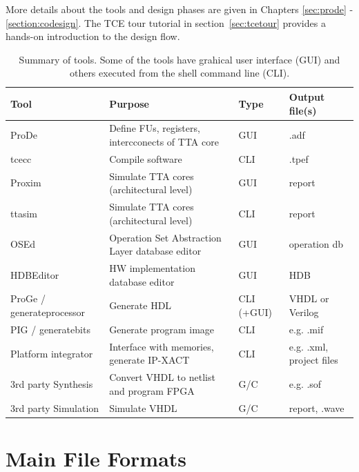 \documentclass[twoside]{tceusermanual}
\begin{document}
More details about the tools and design phases are given in Chapters
\ref{sec:prode} - \ref{section:codesign}. The TCE tour tutorial in
section~\ref{sec:tcetour} provides a hands-on introduction to the design
flow.

\begin{table}
  \begin{center}
    \caption {Summary of tools. Some of the tools have grahical
    user interface (GUI) and others executed from the shell command
    line (CLI).}
    \label {tab:phases}
    \begin{tabular}{l | l | l | l }
      \hline
      Tool & Purpose & Type & Output file(s)\\
      \hline
      \hline
      ProDe                & Define FUs, registers, intercconects of TTA core & GUI  & .adf \\
      tcecc                & Compile software                                 & CLI  & .tpef \\
      Proxim               & Simulate TTA cores (architectural level)         & GUI  & report \\
      ttasim               & Simulate TTA cores (architectural level)         & CLI  & report \\
      OSEd                 & Operation Set Abstraction Layer database editor  & GUI  & operation db \\
      HDBEditor            & HW implementation database editor                & GUI  & HDB  \\
      \hline
      ProGe / generateprocessor             & Generate HDL                    & CLI (+GUI) & VHDL or Verilog \\
      PIG / generatebits   & Generate program image                           & CLI  & e.g. .mif  \\
      Platform integrator  & Interface with memories, generate IP-XACT        & CLI  & e.g. .xml, project files \\
      \hline
      3rd party Synthesis  & Convert VHDL to netlist and program FPGA         & G/C  &  e.g. .sof\\
      3rd party Simulation & Simulate VHDL                                    & G/C  &  report, .wave \\
      \hline
    \end{tabular}
  \end{center}
\end{table}


\section{Main File Formats}
\label{section:fileFormats}
\end{document}
